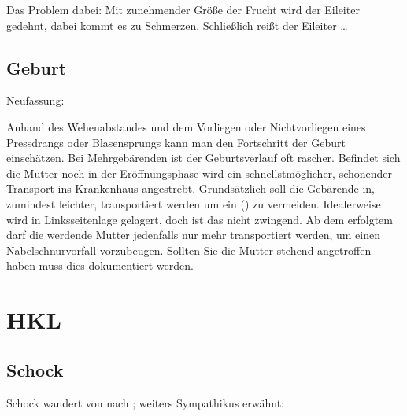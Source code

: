 \documentclass[
ngerman,
paper=a4,
asymmetric,
fontsize=10pt,
draft=false,
numbers=noenddot,
bibtotocnumbered,
footnotes=multiple,
]{scrreprt}
\newcommand{\jNEU}{\vspace{6pt}\noindent{\color{green}\sffamily\textbf{ADDED}\hrulefill\newline}}
\newcommand{\jNEUende}{\newline{\color{green}\rule{\linewidth}{3pt}\newline}}
\begin{document}



Das Problem dabei: Mit zunehmender Größe der Frucht wird der
Eileiter gedehnt, dabei kommt es zu Schmerzen. Schließlich reißt der Eileiter
\ldots









\subsection{Geburt}
Neufassung:

\jNEU
Anhand des Wehenabstandes und dem Vorliegen oder
Nichtvorliegen eines Pressdrangs oder Blasensprungs kann
man den Fortschritt der Geburt einschätzen. 
Bei Mehrgebärenden ist der Geburtsverlauf oft rascher. 
Befindet
sich die Mutter noch in der Eröffnungsphase wird ein 
schnellstmöglicher, schonender Transport ins Krankenhaus 
angestrebt. Grundsätzlich soll die Gebärende in,
zumindest leichter,  transportiert werden
um ein 
() zu vermeiden.
Idealerweise wird in Linksseitenlage gelagert, doch ist das
nicht zwingend. Ab dem erfolgtem  darf die
werdende Mutter jedenfalls nur mehr 
transportiert werden, um einen Nabelschnurvorfall vorzubeugen.
Sollten Sie die Mutter stehend
angetroffen haben muss dies dokumentiert werden.
\jNEUende




\section{HKL}
\subsection{Schock}
Schock wandert von \CC{[VIT]} nach \CC{[HKL]}; weiters Sympathikus erwähnt:
\end{document}
